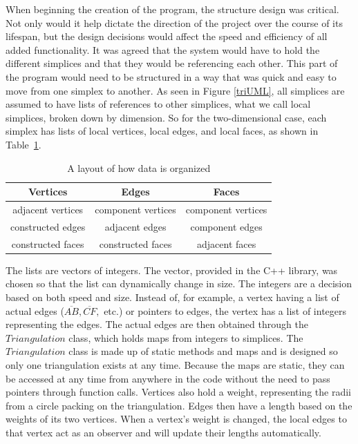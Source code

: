 \documentclass[12pt]{article}
\begin{document}
When beginning the creation of the program, the structure design was critical. Not only would it help dictate the direction of the project over the course of its lifespan, but the design decisions would affect the speed and efficiency of all added functionality. It was agreed that the system would have to hold the different simplices and that they would be referencing each other. This part of the program would need to be structured in a way that was quick and easy to move from one simplex to another. As seen in Figure \ref{triUML}, all simplices are assumed to have lists of references to other simplices, what we call local simplices, broken down by dimension. So for the two-dimensional case, each simplex has lists of local vertices, local edges, and local faces, as shown in Table~\ref{geomat}.\newline

  \begin{table}[b]
  \begin{center}
  \begin{tabular}{|c|c|c|}
  \hline
  Vertices & Edges & Faces\\
  \hline
  adjacent vertices & component vertices & component vertices\\
  constructed edges & adjacent edges & component edges\\
  constructed faces & constructed faces & adjacent faces\\
  \hline
  \end{tabular}
  \end{center}
  \caption{A layout of how data is organized}
  \label{geomat}
  \end{table}
  
\noindent The lists are vectors of integers. The vector, provided in the C++ library, was chosen so that the list can dynamically change in size. The integers are a decision based on both speed and size. Instead of, for example, a vertex having a list of actual edges ($\overline{AB}, \overline{CF},$ etc.) or pointers to edges, the vertex has a list of integers representing the edges. The actual edges are then obtained through the $Triangulation$ class, which holds maps from integers to simplices. The $Triangulation$ class is made up of static methods and maps and is designed so only one triangulation exists at any time. Because the maps are static, they can be accessed at any time from anywhere in the code without the need to pass pointers through function calls. Vertices also hold a weight, representing the radii from a circle packing on the triangulation. Edges then have a length based on the weights of its two vertices. When a vertex's weight is changed, the local edges to that vertex act as an observer and will update their lengths automatically.\newline
\end{document}

